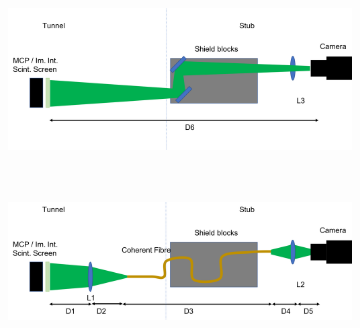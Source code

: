 \begin{figure}[!ht]
	\begin{subfigure}[t]{0.5\textwidth}
		\includegraphics[width=\textwidth]{05_Conclusion/figures/fig000_schematic_telescop_lens}
		\caption{}
		\label{}
	\end{subfigure}
	~
	\begin{subfigure}[t]{0.5\textwidth}
		\includegraphics[width=\textwidth]{05_Conclusion/figures/fig000_schematic_coherentr_fiber}
		\caption{}
		\label{}
	\end{subfigure}
	\caption[]{}
	\label{chap5:schematic}
\end{figure}
